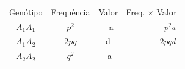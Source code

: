 \documentclass[portuges,]{tufte-handout}
\begin{document}
\begin{longtable}[c]{@{}cccr@{}}
\toprule\addlinespace
\begin{minipage}[b]{0.15\columnwidth}\centering
Genótipo
\end{minipage} & \begin{minipage}[b]{0.22\columnwidth}\centering
Frequência
\end{minipage} & \begin{minipage}[b]{0.12\columnwidth}\centering
Valor
\end{minipage} & \begin{minipage}[b]{0.18\columnwidth}\raggedleft
Freq. \(\times\) Valor
\end{minipage}
\\\addlinespace
\midrule\endhead
\begin{minipage}[t]{0.15\columnwidth}\centering
\(A_1A_1\)
\end{minipage} & \begin{minipage}[t]{0.22\columnwidth}\centering
\(p^2\)
\end{minipage} & \begin{minipage}[t]{0.12\columnwidth}\centering
+a
\end{minipage} & \begin{minipage}[t]{0.18\columnwidth}\raggedleft
\(p^2a\)
\end{minipage}
\\\addlinespace
\begin{minipage}[t]{0.15\columnwidth}\centering
\(A_1A_2\)
\end{minipage} & \begin{minipage}[t]{0.22\columnwidth}\centering
\(2pq\)
\end{minipage} & \begin{minipage}[t]{0.12\columnwidth}\centering
d
\end{minipage} & \begin{minipage}[t]{0.18\columnwidth}\raggedleft
\(2pqd\)
\end{minipage}
\\\addlinespace
\begin{minipage}[t]{0.15\columnwidth}\centering
\(A_2A_2\)
\end{minipage} & \begin{minipage}[t]{0.22\columnwidth}\centering
\(q^2\)
\end{minipage} & \begin{minipage}[t]{0.12\columnwidth}\centering
-a
\end{minipage} & \begin{minipage}[t]{0.18\columnwidth}\raggedleft

\end{minipage}
\end{longtable}
\end{document}
